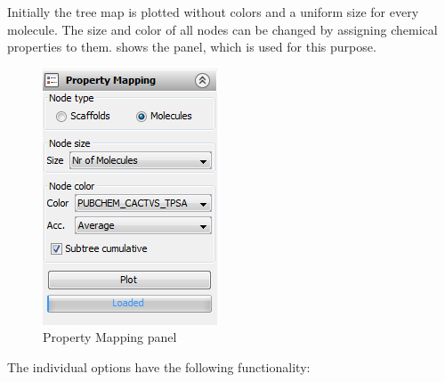Initially the tree map is plotted without colors and a uniform size for every molecule. The size and color of all nodes can be changed by assigning chemical properties to them.  shows the  panel, which is used for this purpose.

%
\begin{figure}[!htb]
\begin{centering}
\includegraphics[scale=.6]{images/treemap/treemap_sidebar_mapping}
\par\end{centering}

\caption{Property Mapping panel}
\label{fig:treemap:sidebar:mapping}

%
\end{figure}

The individual options have the following functionality:

